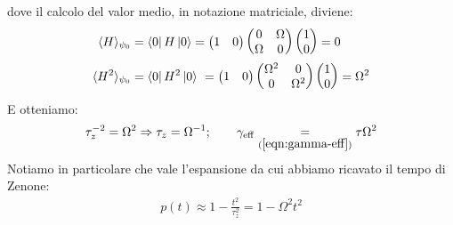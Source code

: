\documentclass[../../InformazioneQuantistica.tex]{subfiles}
\begin{document}
dove il calcolo del valor medio, in notazione matriciale, diviene:
\begin{align*}
\langle H\rangle_{\psi_0} &= \Bra{0}H\Ket{0} = \begin{pmatrix}1 & 0\end{pmatrix}\begin{pmatrix} 0 & \Omega\\\Omega & 0\end{pmatrix}\begin{pmatrix}1 \\ 0\end{pmatrix}=0\\
\langle H^2 \rangle_{\psi_0} &= \Bra{0}H^2\Ket{0}\ = \begin{pmatrix} 1 & 0\end{pmatrix}\begin{pmatrix} \Omega^2 & 0\\ 0 & \Omega^2 \end{pmatrix}\begin{pmatrix} 1 \\ 0\end{pmatrix}=\Omega^2
\end{align*}
E otteniamo:
\begin{align}
\tau_z^{-2}=\Omega^2 \Rightarrow \tau_z=\Omega^{-1};\qquad \gamma_{\operatorname{eff}} \underset{(\ref{eqn:gamma-eff})}{=}\tau \Omega^2\label{eqn:gamma-eff-esempio}  
\end{align}
Notiamo in particolare che vale l'espansione da cui abbiamo ricavato il tempo di Zenone:
\begin{align*}
p(t) \approx 1 - \frac{t^2}{\tau_z^2} = 1-\Omega^2 t^2
\end{align*}
\end{document}
